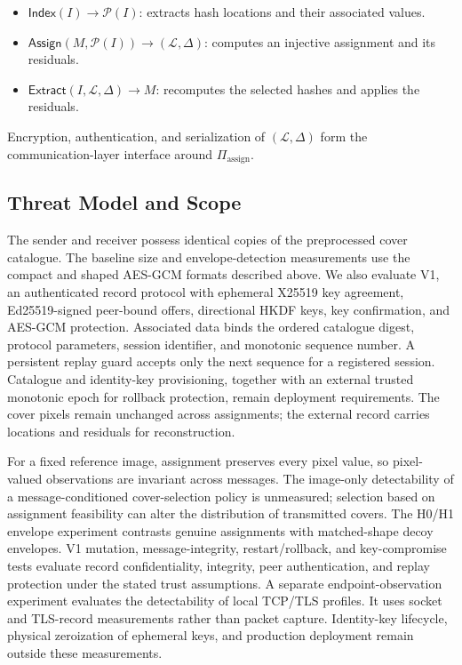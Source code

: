 \documentclass[preprint,12pt]{elsarticle}
\theoremstyle{plain}
\begin{document}
\begin{itemize}
    \item $\mathsf{Index}(I) \rightarrow \mathcal{P}(I)$: extracts hash locations and their associated values.
    \item $\mathsf{Assign}(M,\mathcal{P}(I)) \rightarrow (\mathcal{L},\Delta)$: computes an injective assignment and its residuals.
    \item $\mathsf{Extract}(I,\mathcal{L},\Delta) \rightarrow M$: recomputes the selected hashes and applies the residuals.
\end{itemize}

Encryption, authentication, and serialization of $(\mathcal{L},\Delta)$ form
the communication-layer interface around $\Pi_{\mathrm{assign}}$.

\subsection{Threat Model and Scope}

The sender and receiver possess identical copies of the preprocessed cover
catalogue. The baseline size and envelope-detection measurements use the
compact and shaped AES-GCM formats described above. We also evaluate V1, an
authenticated record protocol with ephemeral X25519 key agreement,
Ed25519-signed peer-bound offers, directional HKDF keys, key confirmation,
and AES-GCM protection. Associated data binds the ordered catalogue digest,
protocol parameters, session identifier, and monotonic sequence number. A
persistent replay guard accepts only the next sequence for a registered
session. Catalogue and identity-key provisioning, together with an external
trusted monotonic epoch for rollback protection, remain deployment
requirements. The cover pixels remain unchanged across assignments; the
external record carries locations and residuals for reconstruction.

For a fixed reference image, assignment preserves every pixel value, so
pixel-valued observations are invariant across messages. The image-only
detectability of a message-conditioned cover-selection policy is unmeasured;
selection based on assignment feasibility can alter the distribution of
transmitted covers. The H0/H1 envelope experiment contrasts genuine
assignments with matched-shape decoy envelopes. V1 mutation, message-integrity,
restart/rollback, and key-compromise tests evaluate record confidentiality,
integrity, peer authentication, and replay protection under the stated trust
assumptions. A separate endpoint-observation experiment evaluates the
detectability of local TCP/TLS profiles. It uses socket and TLS-record
measurements rather than packet capture. Identity-key lifecycle, physical
zeroization of ephemeral keys, and production deployment remain outside these
measurements.
\end{document}
